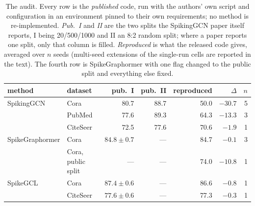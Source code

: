 \begin{table}[t]
\centering
\footnotesize
\caption{The audit. Every row is the \emph{published} code, run with the authors' own script and configuration in an environment pinned to their own requirements; no method is re-implemented. \emph{Pub.\ I} and \emph{II} are the two splits the SpikingGCN paper itself reports, I being 20/500/1000 and II an 8:2 random split; where a paper reports one split, only that column is filled. \emph{Reproduced} is what the released code gives, averaged over $n$ seeds (multi-seed extensions of the single-run cells are reported in the text). The fourth row is SpikeGraphormer with one flag changed to the public split and everything else fixed.}\label{tab:audit}
\begin{tabular}{llrrrrr}
\toprule
method & dataset & pub.\ I & pub.\ II & reproduced & $\Delta$ & $n$ \\
\midrule
SpikingGCN & Cora & 80.7 & 88.7 & 50.0 & $-30.7$ & 5 \\
 & PubMed & 77.6 & 89.3 & 64.3 & $-13.3$ & 3 \\
 & CiteSeer & 72.5 & 77.6 & 70.6 & $-1.9$ & 1 \\
SpikeGraphormer & Cora & $84.8{\pm}0.7$ & --- & 84.7 & $-0.1$ & 3 \\
 & Cora, public split & --- & --- & 74.0 & $-10.8$ & 1 \\
SpikeGCL & Cora & $87.4{\pm}0.6$ & --- & 86.6 & $-0.8$ & 1 \\
 & CiteSeer & $77.6{\pm}0.6$ & --- & 77.3 & $-0.3$ & 1 \\
\bottomrule
\end{tabular}
\end{table}
